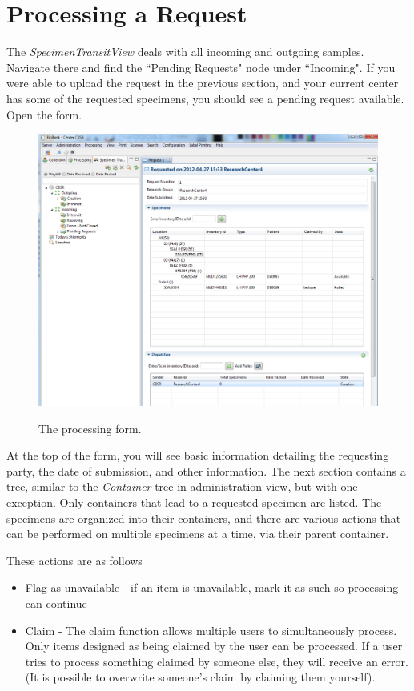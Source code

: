  \section{Processing a Request}
 
 The \emph{SpecimenTransitView} deals with all incoming and outgoing samples.  Navigate there and find the ``Pending Requests" node under ``Incoming".  If you were able to upload the request in the previous section, and your current center has some of the requested specimens, you should see a pending request available.  Open the form.

\begin{figure}[H]
      \centering
      \scalebox{0.5}
      { \includegraphics*{screenshots/specimen_request/request_form.png} }
      \caption{The processing form.}
      \label{Request Form}
\end{figure}
      
At the top of the form, you will see basic information detailing the requesting party, the date of submission, and other information.  The next section contains a tree, similar to the \emph{Container} tree in administration view, but with one exception. Only containers that lead to a requested specimen are listed.  The specimens are organized into their containers, and there are various actions that can be performed on multiple specimens at a time, via their parent container.  
      
These actions are as follows
\begin{itemize}
\item Flag as unavailable - if an item is unavailable, mark it as such so processing can continue
\item Claim - The claim function allows multiple users to simultaneously process.  Only items designed as being claimed by the user can be processed.  If a user tries to process something claimed by someone else, they will receive an error. (It is possible to overwrite someone's claim by claiming them yourself).
\end{itemize}
 
